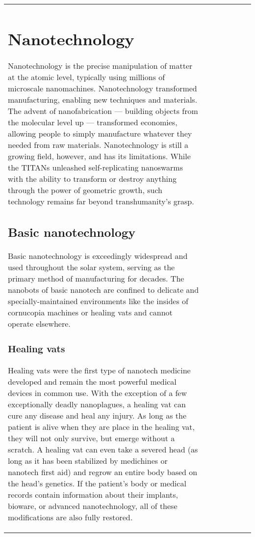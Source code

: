 \begin{tabular}{|l|l|l|l|l|l|l|}
\section{Nanotechnology} \label{sec:nanotech} 

Nanotechnology is the precise manipulation of matter at the atomic level, typically using millions of microscale nanomachines. Nanotechnology transformed manufacturing, enabling new techniques and materials. The advent of nanofabrication --- building objects from the molecular level up --- transformed economies, allowing people to simply manufacture whatever they needed from raw materials. Nanotechnology is still a growing field, however, and has its limitations. While the TITANs unleashed self-replicating nanoswarms with the ability to transform or destroy anything through the power of geometric growth, such technology remains far beyond transhumanity’s grasp. 



\subsection{Basic nanotechnology} \label{sec:basic-nanotech} 

Basic nanotechnology is exceedingly widespread and used throughout the solar system, serving as the primary method of manufacturing for decades. The nanobots of basic nanotech are confined to delicate and specially-maintained environments like the insides of cornucopia machines or healing vats and cannot operate elsewhere. 

\subsubsection{Healing vats} 

Healing vats were the first type of nanotech medicine developed and remain the most powerful medical devices in common use. With the exception of a few exceptionally deadly nanoplagues, a healing vat can cure any disease and heal any injury. As long as the patient is alive when they are place in the healing vat, they will not only survive, but emerge without a scratch. A healing vat can even take a severed head (as long as it has been stabilized by medichines or nanotech first aid) and regrow an entire body based on the head’s genetics. If the patient’s body or medical records contain information about their implants, bioware, or advanced nanotechnology, all of these modifications are also fully restored. 


\end{tabular}

